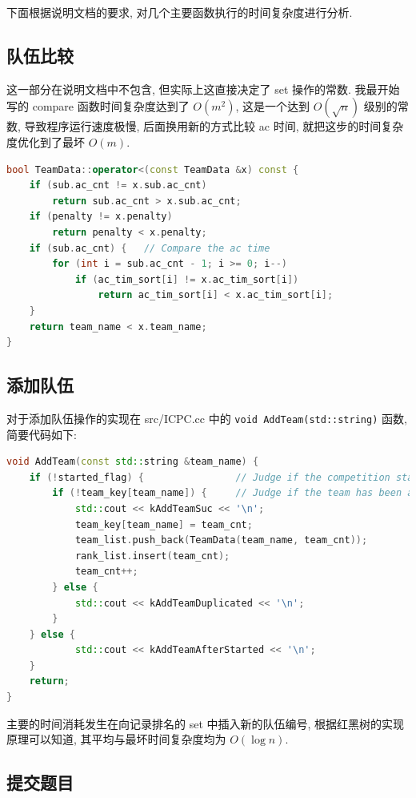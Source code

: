 \documentclass[UTF8, a4paper, 11pt]{ctexart}
\theoremstyle{definition}
\begin{document}
下面根据说明文档的要求, 对几个主要函数执行的时间复杂度进行分析.

\subsection{队伍比较}

这一部分在说明文档中不包含, 但实际上这直接决定了 set 操作的常数. 我最开始写的 compare 函数时间复杂度达到了 $O(m^2)$, 这是一个达到 $O (\sqrt{n})$ 级别的常数, 导致程序运行速度极慢, 后面换用新的方式比较 ac 时间, 就把这步的时间复杂度优化到了最坏 $O(m)$.

\begin{lstlisting}[language=C++]
bool TeamData::operator<(const TeamData &x) const {
    if (sub.ac_cnt != x.sub.ac_cnt)
        return sub.ac_cnt > x.sub.ac_cnt;
    if (penalty != x.penalty)
        return penalty < x.penalty;
    if (sub.ac_cnt) {   // Compare the ac time
        for (int i = sub.ac_cnt - 1; i >= 0; i--)
            if (ac_tim_sort[i] != x.ac_tim_sort[i])
                return ac_tim_sort[i] < x.ac_tim_sort[i];
    }
    return team_name < x.team_name;
}
\end{lstlisting}

\subsection{添加队伍}

对于添加队伍操作的实现在 src/ICPC.cc 中的 \texttt{void AddTeam(std::string)} 函数, 简要代码如下:

\begin{lstlisting}[language=C++]
void AddTeam(const std::string &team_name) {
    if (!started_flag) {                // Judge if the competition started
        if (!team_key[team_name]) {     // Judge if the team has been added
            std::cout << kAddTeamSuc << '\n';
            team_key[team_name] = team_cnt;
            team_list.push_back(TeamData(team_name, team_cnt));
            rank_list.insert(team_cnt);
            team_cnt++;
        } else {
            std::cout << kAddTeamDuplicated << '\n';
        }
    } else {
            std::cout << kAddTeamAfterStarted << '\n';
    }
    return;
}
\end{lstlisting}

主要的时间消耗发生在向记录排名的 set 中插入新的队伍编号, 根据红黑树的实现原理可以知道, 其平均与最坏时间复杂度均为 $O(\log n)$.

\subsection{提交题目}
\end{document}
